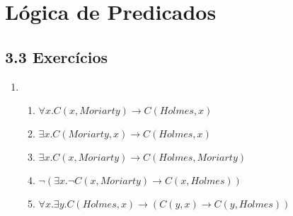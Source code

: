 \section{L\'ogica de Predicados}

\subsection{3.3 Exerc\'icios}

	\begin{enumerate}
		\item 
		\begin{enumerate}
			\item $\forall x. C(x, Moriarty) \to C(Holmes, x)$
			\item $\exists x. C(Moriarty, x) \to C(Holmes, x)$
			\item $\exists x. C(x, Moriarty) \to C(Holmes, Moriarty)$
			\item $\neg(\exists x. \neg C(x, Moriarty) \to C(x, Holmes))$
			\item $\forall x.\exists y. C(Holmes, x) \to (C(y, x) \to C(y, Holmes))$
		\end{enumerate}
		

\end{enumerate}
